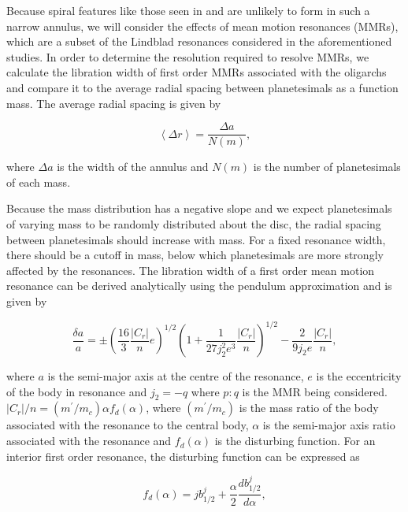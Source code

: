 Because spiral features like those seen in \cite{weinberg07a, weinberg07b} and \cite{cionco02} are unlikely to form in such a 
narrow annulus, we will consider the effects of mean motion resonances (MMRs), which are a subset of the Lindblad resonances 
considered in the aforementioned studies. In order to determine the resolution required to resolve MMRs, we calculate the 
libration width of first order MMRs associated with the oligarchs and compare it to the average radial spacing between 
planetesimals as a function mass. The average radial spacing is given by

\begin{equation}\label{eq:spacing}
\left< \Delta r \right> = \frac{\Delta a}{N(m)},
\end{equation}

\noindent where $\Delta a$ is the width of the annulus and $N(m)$ is the number of planetesimals of each mass.

Because the mass distribution has a negative slope and we expect planetesimals of varying mass to be randomly distributed 
about the disc, the radial spacing between planetesimals should increase with mass. For a fixed resonance width, there should 
be a cutoff in mass, below which planetesimals are more strongly affected by the resonances. The libration width of a first order 
mean motion resonance can be derived analytically using the pendulum approximation \cite{murray00} and is given by

\begin{equation}\label{eq:lib_width}
\frac{\delta a}{a} = \pm \left(\frac{16}{3} \frac{\left| C_{r} \right|}{n} e \right)^{1/2} \left(  1 + \frac{1}{27 j_{2}^2 e^3} \frac{\left| C_{r} \right|}{n} \right)^{1/2} - \frac{2}{9 j_{2} e}  \frac{\left| C_{r} \right|}{n},
\end{equation}

\noindent where $a$ is the semi-major axis at the centre of the resonance, $e$ is the eccentricity of the body in resonance and 
$j_2 = -q$ where $p:q$ is the MMR being considered. $\left| C_{r} \right|/n = (m^{\prime}/m_{c}) \alpha f_{d}(\alpha)$, where $
(m^{\prime}/m_{c})$ is the mass ratio of the body associated with the resonance to the central body, $\alpha$ is the semi-major 
axis ratio associated with the resonance and $f_{d}(\alpha)$ is the disturbing function. For an interior first order resonance, the 
disturbing function can be expressed as

\begin{equation}\label{eq:dist}
f_{d}(\alpha) = j b_{1/2}^{j} + \frac{\alpha}{2}\frac{d b_{1/2}^{j}}{d \alpha},
\end{equation}

